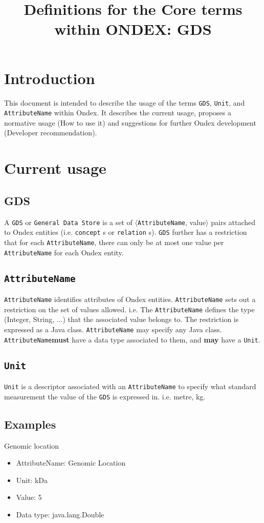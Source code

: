 \documentclass[a4paper,10pt]{article}
\title{Definitions for the Core terms within ONDEX: GDS}
\newcommand{\term}[1]{\texttt{#1}\xspace}
\newcommand{\an}{\term{AttributeName}}
\newcommand{\gds}{\term{GDS}}
\newcommand{\unit}{\term{Unit}}
\begin{document}
\maketitle

\section{Introduction}

This document is intended to describe the usage of the terms \term{GDS}, \term{Unit}, and \term{AttributeName} within Ondex. It describes the current usage, proposes a normative usage (How to use it) and suggestions for further Ondex development (Developer recommendation). 


\section{Current usage}

\subsection{GDS}
A \gds or \term{General Data Store} is a set of $\langle$\an , value$\rangle$ pairs attached to Ondex entities (i.e. \term{concept}s or \term{relation}s). \gds further has a restriction that for each \an, there can only be at most one value per \an for each Ondex entity.

\subsection{\an}
\an identifies attributes of Ondex entities.
\vskip 0.5cm
\noindent
\an sets out a restriction on the set of values allowed. i.e. The \an defines the type (Integer, String, ...) that the associated value belongs to. The restriction is expressed as a Java class. \an may specify any Java class.
\vskip 0.5cm
\noindent
\an \textbf{must} have a data type associated to them, and \textbf{may} have a \unit.


\subsection{\unit}
\unit is a descriptor associated with an \an to specify what standard measurement the value of the \gds is expressed in. i.e. metre, kg.

\subsection{Examples}
Genomic location
\begin{itemize}
\item AttributeName: Genomic Location
\item Unit: kDa
\item Value: 5
\item Data type: java.lang.Double
\end{itemize}
\end{document}
